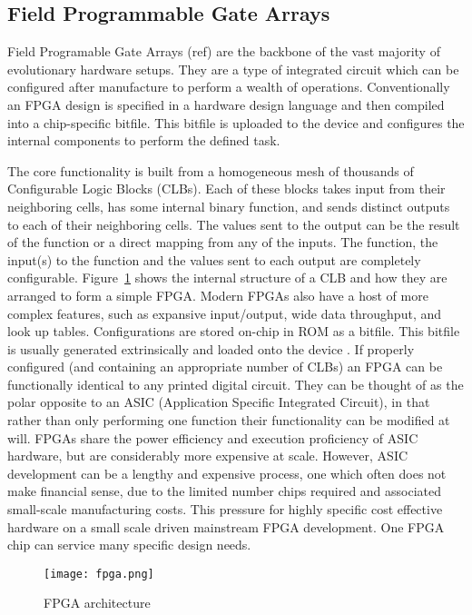 \subsection{Field Programmable Gate Arrays \label{ss:FPGAs}}
Field Programable Gate Arrays (\todo ref) are the backbone of the vast majority of evolutionary
hardware setups. They are a type of integrated circuit which can be
configured after manufacture to perform a wealth of operations. Conventionally
an FPGA design is specified in a hardware design language and then compiled into a chip-specific bitfile.
This bitfile is uploaded to the device and configures the internal components
to perform the defined task.

The core functionality is built from a homogeneous mesh of
thousands of Configurable Logic Blocks (CLBs).
Each of these blocks takes input from their
neighboring cells, has some internal binary function, and sends distinct outputs
to each of their neighboring cells. The values sent to the output can be the
result of the function or a direct mapping from any of the inputs. The function, the input(s) to the function
and the values sent to each output are completely configurable. Figure~\ref{fig:fpga}
shows the internal structure of a CLB and how they are arranged to form a simple FPGA.
Modern FPGAs also have a host of more complex features, such as expansive input/output,
wide data throughput, and look up tables.
Configurations are stored on-chip in ROM as a bitfile. This bitfile is usually generated
extrinsically \cite{10.1007/978-3-540-46239-2_5} and loaded onto the device \cite{Kuon:2008:FAS:1454695.1454696}.
If properly configured (and containing an appropriate number of CLBs) an FPGA can
be functionally identical to any printed digital circuit. They can be thought of
as the polar opposite to an ASIC (Application Specific Integrated Circuit), in that
rather than only performing one function their functionality can be modified at will.
FPGAs share the power efficiency and execution proficiency of ASIC hardware, but
are considerably more expensive at scale. However, ASIC development can
be a lengthy and expensive process, one which often does not make financial sense,
due to the limited number chips required and associated small-scale manufacturing
costs. This pressure for highly specific cost effective hardware on a small scale
driven mainstream FPGA development. One FPGA chip can service many specific
design needs.

\begin{figure}
\centering
\texttt{[image: fpga.png]}
\caption{FPGA architecture}
\label{fig:fpga}
\end{figure}

